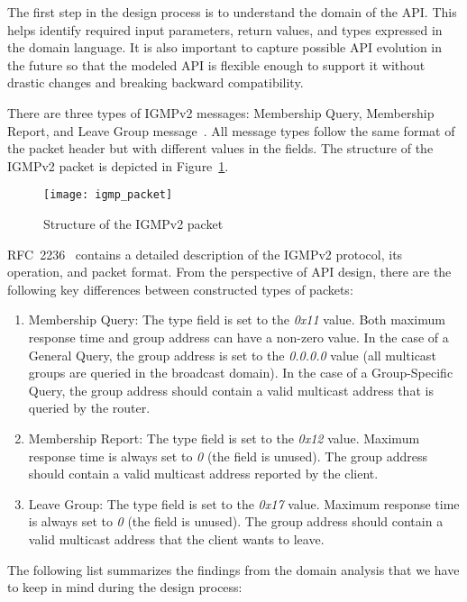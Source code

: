 The first step in the design process is to understand the domain of the API\@.
This helps identify required input parameters, return values, and types expressed in the domain language.
It is also important to capture possible API evolution in the future so that the modeled API is flexible enough
to support it without drastic changes and breaking backward compatibility.

There are three types of IGMPv2 messages: Membership Query, Membership Report, and Leave Group message~\cite{rfc2236}.
All message types follow the same format of the packet header but with different values in the fields.
The structure of the IGMPv2 packet is depicted in Figure~\ref{fig:igmp_packet}.

\begin{figure}[!htb]
\centering
\texttt{[image: igmp\_packet]}
\caption{Structure of the IGMPv2 packet \cite{rfc2236}}
\label{fig:igmp_packet}
\end{figure}

RFC~2236~\cite{rfc2236} contains a detailed description of the IGMPv2 protocol, its operation, and packet format.
From the perspective of API design, there are the following key differences between constructed
types of packets:

\begin{enumerate}
    \item Membership Query:
    The type field is set to the \textit{0x11} value.
    Both maximum response time and group address can have a non-zero value.
    In the case of a General Query, the group address is set to the \textit{0.0.0.0} value
    (all multicast groups are queried in the broadcast domain).
    In the case of a Group-Specific Query, the group address should contain a valid multicast address
    that is queried by the router.
    \item Membership Report:
    The type field is set to the \textit{0x12} value.
    Maximum response time is always set to \textit{0} (the field is unused).
    The group address should contain a valid multicast address reported by the client.
    \item Leave Group:
    The type field is set to the \textit{0x17} value.
    Maximum response time is always set to \textit{0} (the field is unused).
    The group address should contain a valid multicast address that the client wants to leave.
\end{enumerate}

The following list summarizes the findings from the domain analysis that we have to keep in mind during
the design process:

